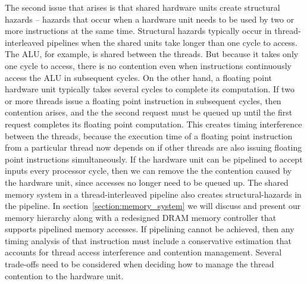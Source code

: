 The second issue that arises is that shared hardware units create structural hazards -- hazards that occur when a hardware unit needs to be used by two or more instructions at the same time.
Structural hazards typically occur in thread-interleaved pipelines when the shared units take longer than one cycle to access. 
The ALU, for example, is shared between the threads.
But because it takes only one cycle to access, there is no contention even when instructions continuously access the ALU in subsequent cycles.
On the other hand, a floating point hardware unit typically takes several cycles to complete its computation.
If two or more threads issue a floating point instruction in subsequent cycles, then contention arises, and the the second request must be queued up until the first request completes its floating point computation.   
This creates timing interference between the threads, because the execution time of a floating point instruction from a particular thread now depends on if other threads are also issuing floating point instructions simultaneously. 
If the hardware unit can be pipelined to accept inputs every processor cycle, then we can remove the the contention caused by the hardware unit, since accesses no longer need to be queued up.
The shared memory system in a thread-interleaved pipeline also creates structural-hazards in the pipeline.
In section~\ref{section:memory_system} we will discuss and present our memory hierarchy along with a redesigned DRAM memory controller that supports pipelined memory accesses.
If pipelining cannot be achieved, then any timing analysis of that instruction must include a conservative estimation that accounts for thread access interference and contention management.
Several trade-offs need to be considered when deciding how to manage the thread contention to the hardware unit.

